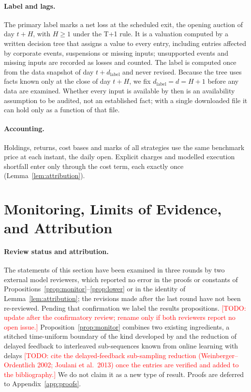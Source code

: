 \documentclass[11pt]{article}
\theoremstyle{remark}
\newcommand{\todo}[1]{\textcolor{red}{[TODO: #1]}}
\begin{document}
\paragraph{Label and lags.}
The primary label marks a net loss at the scheduled exit, the opening auction of day $t+H$, with
$H\ge1$ under the T+1 rule. It is a valuation computed by a written decision tree that assigns a
value to every entry, including entries affected by corporate events, suspensions or missing
inputs; unsupported events and missing inputs are recorded as losses and counted. The label is
computed once from the data snapshot of day $t+d_{\mathrm{label}}$ and never revised. Because
the tree uses facts known only at the close of day $t+H$, we fix
$d_{\mathrm{label}}=d=H+1$ before any data are examined. Whether every input is available by
then is an availability assumption to be audited, not an established fact; with a single
downloaded file it can hold only as a function of that file.

\paragraph{Accounting.}
Holdings, returns, cost bases and marks of all strategies use the same benchmark price at each
instant, the daily open. Explicit charges and modelled execution shortfall enter only through
the cost term, each exactly once (Lemma~\ref{lem:attribution}).

\section{Monitoring, Limits of Evidence, and Attribution}
\label{sec:theory}

\paragraph{Review status and attribution.}
The statements of this section have been examined in three rounds by two external model
reviewers, which reported no error in the proofs or constants of
Propositions~\ref{prop:monitor}--\ref{prop:lower} or in the identity of
Lemma~\ref{lem:attribution}; the revisions made after the last round have not been re-reviewed.
Pending that confirmation we label the results propositions.
\todo{update after the confirmatory review; rename only if both reviewers report no open issue.}
Proposition~\ref{prop:monitor} combines two existing ingredients, a stitched time-uniform
boundary of the kind developed by \citet{howard2021timeuniform} and the reduction of delayed
feedback to interleaved sub-sequences known from online learning with delays
\todo{cite the delayed-feedback sub-sampling reduction (Weinberger--Ordentlich 2002; Joulani et
al.\ 2013) once the entries are verified and added to the bibliography.}
We do not claim it as a new type of result. Proofs are deferred to Appendix~\ref{app:proofs}.
\end{document}
